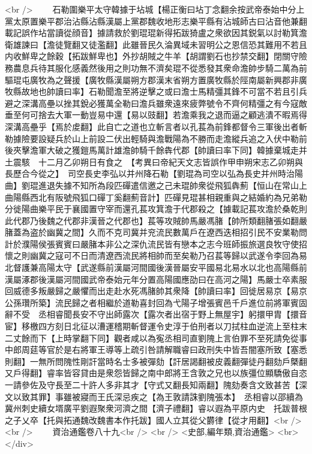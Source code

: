 <br />
　　石勒圍樂平太守韓據于坫城【楊正衡曰坫丁念翻余按武帝泰始中分上黨太原置樂平郡治沾縣沾縣漢屬上黨郡魏收地形志樂平縣有沾城師古曰沾音他兼翻載記誤作坫當讀從顔音】據請救於劉琨琨新得拓跋猗盧之衆欲因其鋭氣以討勒箕澹衛雄諫曰【澹徒覽翻又徒濫翻】此雖晉民久淪異域未習明公之恩信恐其難用不若且内收鮮卑之餘穀【拓跋鮮卑也】外抄胡賊之牛羊【胡謂劉石也抄禁交翻】閉關守險務農息兵待其服化感義然後用之則功無不濟矣琨不從悉發其衆命澹帥步騎二萬為前驅琨屯廣牧為之聲援【廣牧縣漢屬朔方郡漢末省朔方置廣牧縣於陘南屬新興郡非廣牧縣故地也帥讀曰率】石勒聞澹至將逆擊之或曰澹士馬精彊其鋒不可當不若且引兵避之深溝高壘以挫其銳必獲萬全勒曰澹兵雖衆遠來疲弊號令不齊何精彊之有今寇敵垂至何可捨去大軍一動豈易中還【易以豉翻】若澹乘我之退而逼之顧逃潰不暇焉得深溝高壘乎【焉於䖍翻】此自亡之道也立斬言者以孔萇為前鋒都督令三軍後出者斬勒據險要設疑兵於山上前設二伏出輕騎與澹戰陽為不勝而走澹縱兵追之入伏中勒前後夾擊澹軍大破之獲鎧馬萬計雄澹帥騎千餘犇代郡【帥讀曰率下同】韓據棄城走并土震駭　十二月乙卯朔日有食之　【考異曰帝紀天文志皆誤作甲申朔宋志乙卯朔與長歷合今從之】　司空長史李弘以并州降石勒【劉琨為司空以弘為長史并州時治陽曲】劉琨進退失據不知所為段匹磾遣信邀之己未琨帥衆從飛狐犇薊【恒山在常山上曲陽縣西北有阪號飛狐口磾丁奚翻薊音計】匹磾見琨甚相親重與之結婚約為兄弟勒分徙陽曲樂平民于襄國置守宰而還孔萇攻箕澹于代郡殺之【據載記萇攻澹於桑乾則此代郡乃後魏之代郡非漢晉之代郡也】萇等攻賊帥馬嚴馮䐗【帥所類翻䐗張如翻嚴䐗蓋為盗於幽冀之間】久而不克司冀并兖流民數萬戶在遼西迭相招引民不安業勒問計於濮陽侯張賓賓曰嚴䐗本非公之深仇流民皆有戀本之志今班師振旅選良牧守使招懷之則幽冀之寇可不日而清遼西流民將相帥而至矣勒乃召萇等歸以武遂令李回為易北督護兼高陽太守【武遂縣前漢屬河間國後漢晉屬安平國易北易水以北也高陽縣前漢屬涿郡後漢屬河間國武帝泰始元年分置高陽國應劭曰在高河之陽】馬嚴士卒素服回威德多叛嚴歸之嚴懼而出走赴水死馮䐗帥其衆降【帥讀曰率】回徙居易京【易京公孫瓚所築】流民歸之者相繼於道勒喜封回為弋陽子增張賓邑千戶進位前將軍賓固辭不受　丞相睿聞長安不守出師露次【露次者出宿于野上無屋宇】躬擐甲胄【擐音宦】移檄四方刻日北征以漕運稽期斬督運令史淳于伯刑者以刀拭柱血逆流上至柱末二丈餘而下【上時掌翻下同】觀者咸以為寃丞相司直劉隗上言伯罪不至死請免從事中郎周莚等官於是右將軍王導等上疏引咎請解職睿曰政刑失中皆吾闇塞所致【塞悉則翻】一無所問隗性剛訐當時名士多被彈劾【訐居謁翻被皮義翻彈徒丹翻劾戶槩翻又戶得翻】睿率皆容貸由是衆怨皆歸之南中郎將王含敦之兄也以族彊位顯驕傲自恣一請參佐及守長至二十許人多非其才【守式又翻長知兩翻】隗劾奏含文致甚苦【深文以致其罪】事雖被寢而王氏深忌疾之【為王敦請誅劉隗張本】　丞相睿以邵續為冀州刺史續女壻廣平劉遐聚衆河濟之間【濟子禮翻】睿以遐為平原内史　托跋普根之子乂卒【托與拓通魏改魏書本作托跋】國人立其從父欝律【從才用翻】<br />
<br />
　　資治通鑑卷八十九<br />
<br />
<史部,編年類,資治通鑑>  <br>
   </div> 


